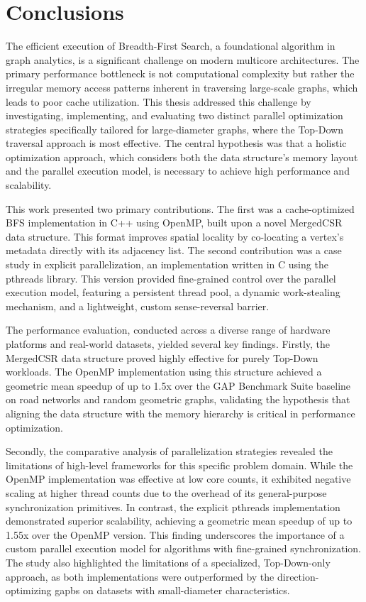 \chapter{Conclusions}
\label{cha:conclusions}
The efficient execution of Breadth-First Search, a foundational algorithm in graph analytics, is a significant challenge on modern multicore architectures. The primary performance bottleneck is not computational complexity but rather the irregular memory access patterns inherent in traversing large-scale graphs, which leads to poor cache utilization. This thesis addressed this challenge by investigating, implementing, and evaluating two distinct parallel optimization strategies specifically tailored for large-diameter graphs, where the Top-Down traversal approach is most effective. The central hypothesis was that a holistic optimization approach, which considers both the data structure's memory layout and the parallel execution model, is necessary to achieve high performance and scalability.

This work presented two primary contributions. The first was a cache-optimized BFS implementation in C++ using OpenMP, built upon a novel MergedCSR data structure. This format improves spatial locality by co-locating a vertex's metadata directly with its adjacency list. The second contribution was a case study in explicit parallelization, an implementation written in C using the pthreads library. This version provided fine-grained control over the parallel execution model, featuring a persistent thread pool, a dynamic work-stealing mechanism, and a lightweight, custom sense-reversal barrier.

The performance evaluation, conducted across a diverse range of hardware platforms and real-world datasets, yielded several key findings. Firstly, the MergedCSR data structure proved highly effective for purely Top-Down workloads. The OpenMP implementation using this structure achieved a geometric mean speedup of up to 1.5x over the GAP Benchmark Suite baseline on road networks and random geometric graphs, validating the hypothesis that aligning the data structure with the memory hierarchy is critical in performance optimization.

Secondly, the comparative analysis of parallelization strategies revealed the limitations of high-level frameworks for this specific problem domain. While the OpenMP implementation was effective at low core counts, it exhibited negative scaling at higher thread counts due to the overhead of its general-purpose synchronization primitives. In contrast, the explicit pthreads implementation demonstrated superior scalability, achieving a geometric mean speedup of up to 1.55x over the OpenMP version. This finding underscores the importance of a custom parallel execution model for algorithms with fine-grained synchronization. The study also highlighted the limitations of a specialized, Top-Down-only approach, as both implementations were outperformed by the direction-optimizing gapbs on datasets with small-diameter characteristics.

